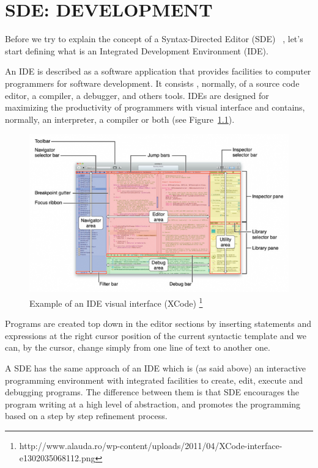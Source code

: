 \documentclass[
  oneside,
  11pt, a4paper,
  footinclude=true,
  headinclude=true,
  cleardoublepage=empty
]{scrbook}
\begin{document}
\chapter{SDE: DEVELOPMENT}

Before we try to explain the concept of a Syntax-Directed Editor (SDE) ~\citep{RT89b,Ko05,alsCH10a,TR81a,RMT86a,RT89a,AHW89}, let's start defining what is an Integrated Development Environment (IDE).

An IDE is described as a software application that provides facilities to computer programmers for software development. It consists , normally, of a source code editor, a compiler, a debugger, and others tools.
IDEs are designed for maximizing the productivity of programmers with visual interface and contains, normally, an interpreter, a compiler or both (see Figure~\ref{fig:ideXCode}).


\begin{figure}[h!]
  \centering
    \includegraphics[width=1\textwidth]{img/XCode-interface.png}
    \caption{Example of an IDE visual interface (XCode) \protect\footnote{http://www.alauda.ro/wp-content/uploads/2011/04/XCode-interface-e1302035068112.png}}
    \label{fig:ideXCode}
\end{figure}

\newpage

Programs are created top down in the editor sections by inserting statements and expressions at the right cursor position of the current syntactic template and we can, by the cursor, change simply from one line of text to another one.

A SDE has the same approach of an IDE which is (as said above) an interactive programming environment with integrated facilities to create, edit, execute and debugging programs.
The difference between them is that SDE encourages the program writing at a high level of abstraction, and promotes the programming based on a step by step refinement process.
\end{document}
